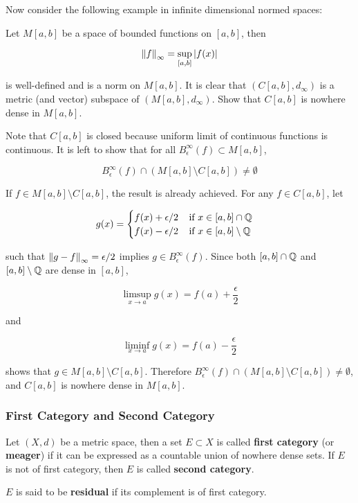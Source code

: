 \documentclass[a4paper,12pt]{article}
\begin{document}
Now consider the following example in infinite dimensional normed spaces:\n

\begin{exm}
  Let $M[a,b]$ be a space of bounded functions on $[a,b]$, then
  
  $$\left\| f\right\|_{\infty}=\underset{[a,b]}{\sup}\left| f(x)\right|$$\s

  is well-defined and is a norm on $M[a,b]$. It is clear that $(C[a,b],d_{\infty})$ is a metric (and vector) subspace of $(M[a,b],d_{\infty})$. Show that $C[a,b]$ is nowhere dense in $M[a,b]$.\n

  \ans Note that $C[a,b]$ is closed because uniform limit of continuous functions is continuous. It is left to show that for all $B_{\epsilon}^{\infty}(f)\subset M[a,b]$,

  $$B_{\epsilon}^{\infty}(f)\cap(M[a,b]\setminus C[a,b])\neq\emptyset$$\s

  If $f\in M[a,b]\setminus C[a,b]$, the result is already achieved. For any $f\in C[a,b]$, let

  $$g(x)=\begin{cases}
    f(x)+\epsilon/2\;\;\;\;\text{if }x\in[a,b]\cap\mathbb{Q}\\
    f(x)-\epsilon/2\;\;\;\;\text{if }x\in[a,b]\setminus\mathbb{Q}
  \end{cases}$$\s

  such that $\left\| g-f\right\|_{\infty}=\epsilon/2$ implies $g\in B_{\epsilon}^{\infty}(f)$. Since both $[a,b]\cap\mathbb{Q}$ and $[a,b]\setminus\mathbb{Q}$ are dense in $[a,b]$,

  $$\underset{x\to a}{\limsup}g(x)=f(a)+\frac{\epsilon}{2}$$\s

  and

  $$\underset{x\to a}{\liminf}g(x)=f(a)-\frac{\epsilon}{2}$$\s

  shows that $g\in M[a,b]\setminus C[a,b]$. Therefore $B_{\epsilon}^{\infty}(f)\cap(M[a,b]\setminus C[a,b])\neq\emptyset$, and $C[a,b]$ is nowhere dense in $M[a,b]$.
\end{exm}

\subsubsection{First Category and Second Category}
\begin{dft}
  Let $(X,d)$ be a metric space, then a set $E\subset X$ is called \textbf{first category} (or \textbf{meager}) if it can be expressed as a countable union of nowhere dense sets. If $E$ is not of first category, then $E$ is called \textbf{second category}.\n

  $E$ is said to be \textbf{residual} if its complement is of first category.
\end{dft}\n
\end{document}
